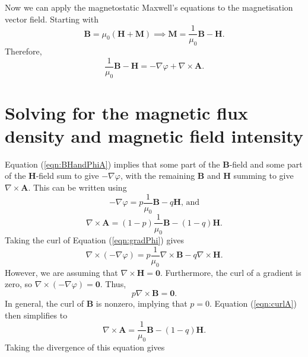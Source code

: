 Now we can apply the magnetostatic Maxwell's equations to the magnetisation vector field. Starting with
\begin{equation}
    \mathbf{B} = \mu_0 \left( \mathbf{H} + \mathbf{M} \right) \implies \mathbf{M} = \frac{1}{\mu_0} \mathbf{B} - \mathbf{H} \text{.}
\end{equation}
Therefore,
\begin{equation}\label{eqn:BHandPhiA}
    \frac{1}{\mu_0} \mathbf{B} - \mathbf{H} =  -\nabla \varphi + \nabla \times \mathbf{A} \text{.}
\end{equation}

\section*{Solving for the magnetic flux density and magnetic field intensity}
Equation (\ref{eqn:BHandPhiA}) implies that some part of the \(\mathbf{B}\)-field and some part of the \(\mathbf{H}\)-field sum to give \(-\nabla \varphi\), with the remaining \(\mathbf{B}\) and \(\mathbf{H}\) summing to give \(\nabla \times \mathbf{A}\). This can be written using
\begin{equation}\label{eqn:gradPhi}
    -\nabla \varphi = p\frac{1}{\mu_0} \mathbf{B} - q\mathbf{H} \text{, and}
\end{equation}
\begin{equation}\label{eqn:curlA}
    \nabla \times \mathbf{A} = \left(1-p\right)\frac{1}{\mu_0}\mathbf{B} - \left(1-q\right) \mathbf{H} \text{.}
\end{equation}
Taking the curl of Equation (\ref{eqn:gradPhi}) gives
\begin{equation}
    \nabla \times \left(-\nabla \varphi\right) = p\frac{1}{\mu_0}\nabla \times \mathbf{B} - q\nabla \times \mathbf{H} \text{.}
\end{equation}
However, we are assuming that \(\nabla \times \mathbf{H} = \mathbf{0}\). Furthermore, the curl of a gradient is zero, so \(\nabla \times \left( -\nabla \varphi\right) = \mathbf{0}\). Thus,
\begin{equation}
    p\nabla \times \mathbf{B} = \mathbf{0} \text{.}
\end{equation}
In general, the curl of \(\mathbf{B}\) is nonzero, implying that \(p = 0\). Equation (\ref{eqn:curlA}) then simplifies to
\begin{equation}
    \nabla \times \mathbf{A} = \frac{1}{\mu_0}\mathbf{B} - \left(1-q\right)\mathbf{H} \text{.}
\end{equation}
Taking the divergence of this equation gives

